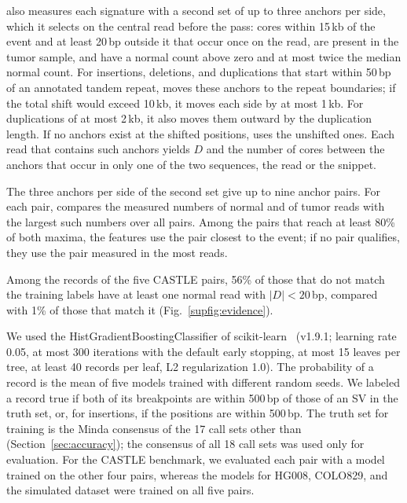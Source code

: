 \tool{} also measures each signature with a second set of up to three anchors per side, which it selects on the central read before the pass: cores within 15\,kb of the event and at least 20\,bp outside it that occur once on the read, are present in the tumor sample, and have a normal count above zero and at most twice the median normal count.
For insertions, deletions, and duplications that start within 50\,bp of an annotated tandem repeat, \tool{} moves these anchors to the repeat boundaries; if the total shift would exceed 10\,kb, it moves each side by at most 1\,kb.
For duplications of at most 2\,kb, it also moves them outward by the duplication length.
If no anchors exist at the shifted positions, \tool{} uses the unshifted ones.
Each read that contains such anchors yields $D$ and the number of cores between the anchors that occur in only one of the two sequences, the read or the snippet.

The three anchors per side of the second set give up to nine anchor pairs.
For each pair, \tool{} compares the measured numbers of normal and of tumor reads with the largest such numbers over all pairs.
Among the pairs that reach at least 80\% of both maxima, the features use the pair closest to the event; if no pair qualifies, they use the pair measured in the most reads.

Among the records of the five CASTLE pairs, 56\% of those that do not match the training labels have at least one normal read with $|D|<20$\,bp, compared with 1\% of those that match it (Fig.~\ref{supfig:evidence}).


We used the HistGradientBoostingClassifier of scikit-learn~\cite{sklearn} (v1.9.1; learning rate 0.05, at most 300 iterations with the default early stopping, at most 15 leaves per tree, at least 40 records per leaf, L2 regularization 1.0).
The probability of a record is the mean of five models trained with different random seeds.
We labeled a record true if both of its breakpoints are within 500\,bp of those of an SV in the truth set, or, for insertions, if the positions are within 500\,bp.
The truth set for training is the Minda consensus of the 17 call sets other than \tool{} (Section~\ref{sec:accuracy}); the consensus of all 18 call sets was used only for evaluation.
For the CASTLE benchmark, we evaluated each pair with a model trained on the other four pairs, whereas the models for HG008, COLO829, and the simulated dataset were trained on all five pairs.

